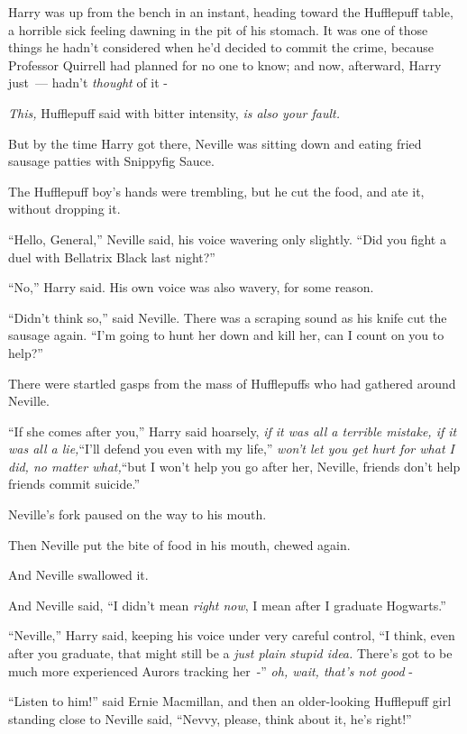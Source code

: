 Harry was up from the bench in an instant, heading toward the Hufflepuff table, a horrible sick feeling dawning in the pit of his stomach. It was one of those things he hadn't considered when he'd decided to commit the crime, because Professor Quirrell had planned for no one to know; and now, afterward, Harry just~--- hadn't \emph{thought} of it -

\emph{This,} Hufflepuff said with bitter intensity, \emph{is also your fault.}

But by the time Harry got there, Neville was sitting down and eating fried sausage patties with Snippyfig Sauce.

The Hufflepuff boy's hands were trembling, but he cut the food, and ate it, without dropping it.

``Hello, General,'' Neville said, his voice wavering only slightly. ``Did you fight a duel with Bellatrix Black last night?''

``No,'' Harry said. His own voice was also wavery, for some reason.

``Didn't think so,'' said Neville. There was a scraping sound as his knife cut the sausage again. ``I'm going to hunt her down and kill her, can I count on you to help?''

There were startled gasps from the mass of Hufflepuffs who had gathered around Neville.

``If she comes after you,'' Harry said hoarsely, \emph{if it was all a terrible mistake, if it was all a lie,}``I'll defend you even with my life,'' \emph{won't let you get hurt for what I did, no matter what,}``but I won't help you go after her, Neville, friends don't help friends commit suicide.''

Neville's fork paused on the way to his mouth.

Then Neville put the bite of food in his mouth, chewed again.

And Neville swallowed it.

And Neville said, ``I didn't mean \emph{right now}, I mean after I graduate Hogwarts.''

``Neville,'' Harry said, keeping his voice under very careful control, ``I think, even after you graduate, that might still be a \emph{just plain} \emph{stupid idea.} There's got to be much more experienced Aurors tracking her~-'' \emph{oh, wait, that's not good} -

``Listen to him!'' said Ernie Macmillan, and then an older-looking Hufflepuff girl standing close to Neville said, ``Nevvy, please, think about it, he's right!''

